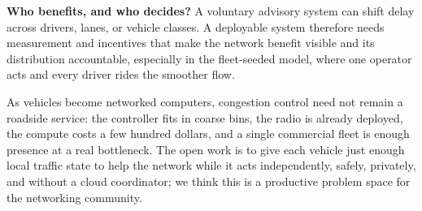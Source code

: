 \noindent\textbf{Who benefits, and who decides?}
A voluntary advisory system can shift delay across drivers, lanes, or vehicle classes. A deployable system therefore needs measurement and incentives that make the network benefit visible and its distribution accountable, especially in the fleet-seeded model, where one operator acts and every driver rides the smoother flow.

As vehicles become networked computers, congestion control need not remain a roadside service: the controller fits in coarse bins, the radio is already deployed, the compute costs a few hundred dollars, and a single commercial fleet is enough presence at a real bottleneck. The open work is to give each vehicle just enough local traffic state to help the network while it acts independently, safely, privately, and without a cloud coordinator; we think this is a productive problem space for the networking community.
